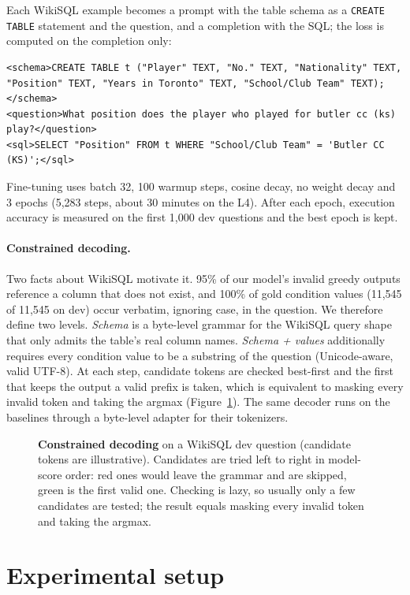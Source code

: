 \documentclass[11pt]{article}
\begin{document}
Each WikiSQL example becomes a prompt with the table schema as a \texttt{CREATE TABLE} statement and the question, and a completion with the SQL; the loss is computed on the completion only:
\begin{lstlisting}
<schema>CREATE TABLE t ("Player" TEXT, "No." TEXT, "Nationality" TEXT, "Position" TEXT, "Years in Toronto" TEXT, "School/Club Team" TEXT);</schema>
<question>What position does the player who played for butler cc (ks) play?</question>
<sql>SELECT "Position" FROM t WHERE "School/Club Team" = 'Butler CC (KS)';</sql>
\end{lstlisting}
Fine-tuning uses batch 32, 100 warmup steps, cosine decay, no weight decay and 3 epochs (5,283 steps, about 30 minutes on the L4). After each epoch, execution accuracy is measured on the first 1,000 dev questions and the best epoch is kept.

\paragraph{Constrained decoding.} Two facts about WikiSQL motivate it. 95\% of our model's invalid greedy outputs reference a column that does not exist, and 100\% of gold condition values (11,545 of 11,545 on dev) occur verbatim, ignoring case, in the question. We therefore define two levels. \emph{Schema} is a byte-level grammar for the WikiSQL query shape that only admits the table's real column names. \emph{Schema + values} additionally requires every condition value to be a substring of the question (Unicode-aware, valid UTF-8). At each step, candidate tokens are checked best-first and the first that keeps the output a valid prefix is taken, which is equivalent to masking every invalid token and taking the argmax (Figure~\ref{fig:constrained}). The same decoder runs on the baselines through a byte-level adapter for their tokenizers.

\begin{figure}[!htbp]
\centering
\resizebox{0.95\linewidth}{!}{}
\caption{\textbf{Constrained decoding} on a WikiSQL dev question (candidate tokens are illustrative). Candidates are tried left to right in model-score order: red ones would leave the grammar and are skipped, green is the first valid one. Checking is lazy, so usually only a few candidates are tested; the result equals masking every invalid token and taking the argmax.}
\label{fig:constrained}
\end{figure}

\section{Experimental setup}
\label{sec:setup}
\end{document}
